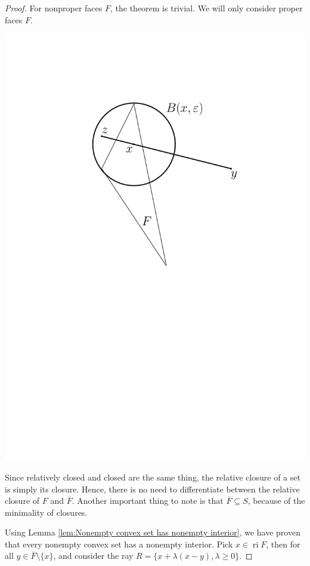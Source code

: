 \begin{proof}
  For nonproper faces \( F \), the theorem is trivial. We will only consider
  proper faces \( F \).

  \centerline{
    \includegraphics[scale=0.5]{figures/1696828548}
  }

  Since relatively closed and closed are the same thing, the relative closure of
  a set is simply its closure. Hence, there is no need to differentiate between
  the relative closure of \( F \) and \( \overline{F} \). Another important
  thing to note is that \( \overline{F} \subseteq S \), because of the
  minimality of closures.

  Using Lemma \ref{lem:Nonempty convex set has nonempty interior}, we have proven
  that every nonempty convex set has a nonempty interior. Pick \( x \in
  \operatorname{ri} F \), then for all \( y \in \overline{F}
  \setminus \{ x\}   \), and consider the ray \( R = \{x + \lambda (x - y),
  \lambda \ge  0\}   \).


\end{proof}
